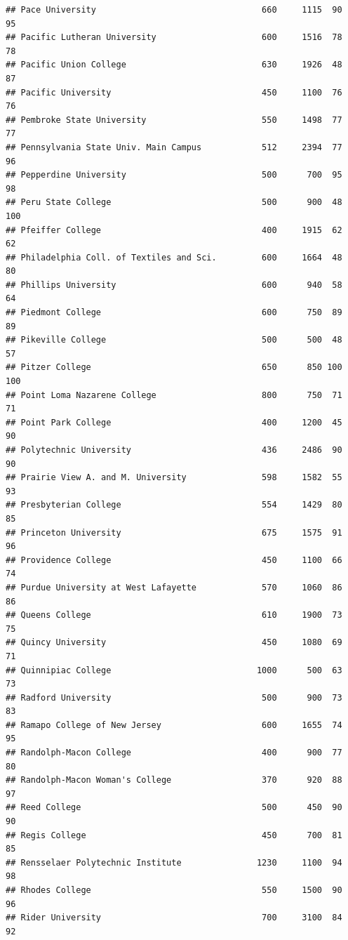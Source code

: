 \documentclass[
]{article}
\begin{document}
\begin{verbatim}
## Pace University                                 660     1115  90       95
## Pacific Lutheran University                     600     1516  78       78
## Pacific Union College                           630     1926  48       87
## Pacific University                              450     1100  76       76
## Pembroke State University                       550     1498  77       77
## Pennsylvania State Univ. Main Campus            512     2394  77       96
## Pepperdine University                           500      700  95       98
## Peru State College                              500      900  48      100
## Pfeiffer College                                400     1915  62       62
## Philadelphia Coll. of Textiles and Sci.         600     1664  48       80
## Phillips University                             600      940  58       64
## Piedmont College                                600      750  89       89
## Pikeville College                               500      500  48       57
## Pitzer College                                  650      850 100      100
## Point Loma Nazarene College                     800      750  71       71
## Point Park College                              400     1200  45       90
## Polytechnic University                          436     2486  90       90
## Prairie View A. and M. University               598     1582  55       93
## Presbyterian College                            554     1429  80       85
## Princeton University                            675     1575  91       96
## Providence College                              450     1100  66       74
## Purdue University at West Lafayette             570     1060  86       86
## Queens College                                  610     1900  73       75
## Quincy University                               450     1080  69       71
## Quinnipiac College                             1000      500  63       73
## Radford University                              500      900  73       83
## Ramapo College of New Jersey                    600     1655  74       95
## Randolph-Macon College                          400      900  77       80
## Randolph-Macon Woman's College                  370      920  88       97
## Reed College                                    500      450  90       90
## Regis College                                   450      700  81       85
## Rensselaer Polytechnic Institute               1230     1100  94       98
## Rhodes College                                  550     1500  90       96
## Rider University                                700     3100  84       92

\end{verbatim}
\end{document}
